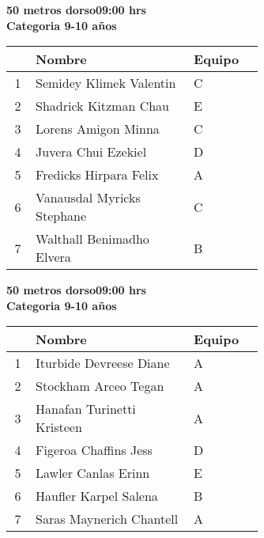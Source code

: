 \begin{minipage}{0.95\linewidth}\vspace{0.5cm} 
\begin{flushleft}
\textbf{
\hspace{-0.15cm}50 metros dorso\hspace{1.5cm}09:00 hrs \\Categoria 9-10 años}\vspace{-0.2cm} 
\end{flushleft}
\begin{tabular}{cp{0.63\linewidth}l}
\hline
& \textbf{Nombre} & \textbf{Equipo} \\ \hline
1 & Semidey Klimek Valentin & C \\ 
2 & Shadrick Kitzman Chau & E \\ 
3 & Lorens Amigon Minna & C \\ 
4 & Juvera Chui Ezekiel & D \\ 
5 & Fredicks Hirpara Felix & A \\ 
6 & Vanausdal Myricks Stephane & C \\ 
7 & Walthall Benimadho Elvera & B \\ 
\end{tabular}
\end{minipage}
\begin{minipage}{0.95\linewidth}\vspace{0.5cm} 
\begin{flushleft}
\textbf{
\hspace{-0.15cm}50 metros dorso\hspace{1.5cm}09:00 hrs \\Categoria 9-10 años}\vspace{-0.2cm} 
\end{flushleft}
\begin{tabular}{cp{0.63\linewidth}l}
\hline
& \textbf{Nombre} & \textbf{Equipo} \\ \hline
1 & Iturbide Devreese Diane & A \\ 
2 & Stockham Arceo Tegan & A \\ 
3 & Hanafan Turinetti Kristeen & A \\ 
4 & Figeroa Chaffins Jess & D \\ 
5 & Lawler Canlas Erinn & E \\ 
6 & Haufler Karpel Salena & B \\ 
7 & Saras Maynerich Chantell & A \\ 
\end{tabular}
\end{minipage}
